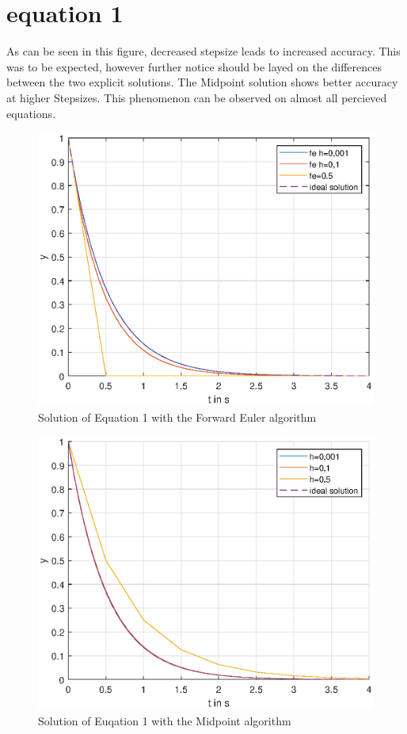 \section{equation 1}
As can be seen in this figure, decreased stepsize leads to increased accuracy. This was to be expected, however further notice should be layed on the differences between the two explicit solutions. The Midpoint solution shows better accuracy at higher Stepsizes. This phenomenon can be observed on almost all percieved equations. 
\begin{figure}[H]
    \centering
    \includegraphics[width=\plotwidth]{plots/fe_only_equation_1.eps}
    \caption{Solution of Equation 1 with the Forward Euler algorithm}
    \label{fig:eq1_fe_only}
\end{figure}

\begin{figure}[H]
    \centering
    \includegraphics[width=\plotwidth]{plots/rk_only_equation_1.eps}
    \caption{Solution of Euqation 1 with the Midpoint algorithm}
    \label{fig:eq1_rk_only}
\end{figure}

